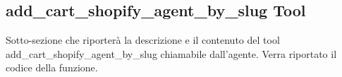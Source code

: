 \subsection{add\_cart\_shopify\_agent\_by\_slug Tool}

Sotto-sezione che riporterà la descrizione e il contenuto del tool add\_cart\_shopify\_agent\_by\_slug chiamabile dall'agente.
Verra riportato il codice della funzione.
